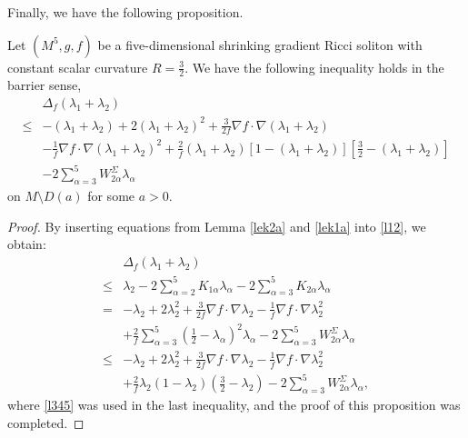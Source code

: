 \documentclass[12pt]{amsart}
\begin{document}
	Finally, we have the following proposition.
	
	\begin{prop}\label{lap12}
		Let $(M^5, g, f)$ be a five-dimensional shrinking gradient Ricci soliton with constant scalar curvature $R=\frac{3}{2}$.  We have the following inequality holds in the barrier sense,
		\begin{equation*}
		\begin{aligned}
		&\Delta_f(\lambda_1+\lambda_2)\\
		\leq&-(\lambda_1+\lambda_2)+2(\lambda_1+\lambda_2)^2+\frac{3}{2f}\nabla f\cdot \nabla (\lambda_1+\lambda_2)\\
		&-\frac{1}{f}\nabla f\cdot \nabla (\lambda_1+\lambda_2)^2
		+\frac{2}{f}(\lambda_1+\lambda_2)[1-(\lambda_1+\lambda_2)]\left[ \frac{3}{2}-(\lambda_1+\lambda_2)\right]\\
		&-2\sum_{\alpha=3}^5 W^{\Sigma}_{2\alpha}\lambda_{\alpha}
		\end{aligned}
		\end{equation*}	
		on $M\setminus D(a)$ for some $a>0$.	
	\end{prop}
	
	\begin{proof} By inserting equations from Lemma \ref{lek2a} and \ref{lek1a} into \eqref{l12}, we obtain:
		\begin{equation*}
		\begin{aligned}
		&\Delta_f(\lambda_1+\lambda_2)\\
		\leq&\lambda_2-2\sum_{\alpha=2}^5K_{1\alpha}\lambda_\alpha-2\sum_{\alpha=3}^5K_{2\alpha}\lambda_\alpha\\
		=&-\lambda_2+2\lambda_2^2+\frac{3}{2f}\nabla f\cdot \nabla \lambda_2-\frac{1}{f}\nabla f\cdot \nabla \lambda_2^2\\
		&+\frac{2}{f}\sum_{\alpha=3}^5({\frac{1}{2}}-\lambda_{\alpha})^2\lambda_{\alpha}
		-2\sum_{\alpha=3}^5 W^{\Sigma}_{2\alpha}\lambda_{\alpha}\\
		\leq&-\lambda_2+2\lambda_2^2+\frac{3}{2f}\nabla f\cdot \nabla \lambda_2-\frac{1}{f}\nabla f\cdot \nabla \lambda_2^2\\
		&+\frac{2}{f}\lambda_2(1-\lambda_2)(\frac{3}{2}-\lambda_2)
		-2\sum_{\alpha=3}^5 W^{\Sigma}_{2\alpha}\lambda_{\alpha},
		\end{aligned}
		\end{equation*}	
		where \eqref{l345} was used in the last inequality, and the proof of this proposition was completed.
	\end{proof}
	
\end{document}
